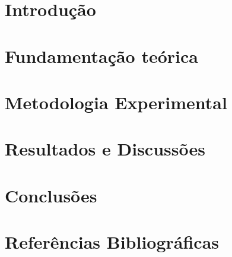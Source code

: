 





    \section{Introdução}\label{Introdução}
        

    \section{Fundamentação teórica}\label{Fundamentação teórica}
        
    
    \section{Metodologia Experimental}\label{Metodologia Experimental}
        
    
    \section{Resultados e Discussões}\label{Resultados e Discussões}
        
        
    \section{Conclusões}\label{Conclusões}
        
        
        
    
    \clearpage
    \section{Referências Bibliográficas}
        
    
        
